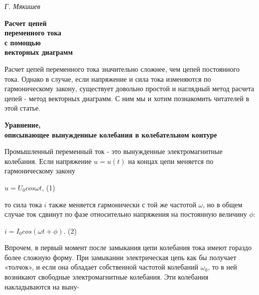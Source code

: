 



\newpage

\renewcommand{\headrulewidth}{0.6pt}
\setcounter{page}{51}
\fancyhf{}
\fancyfoot[R]{\bfseries\thepage}

\begin{multicols}{2}
\begin{flushleft}
    \textit{Г. Мякишев}
\end{flushleft}

\begin{flushleft}
    \Large \textbf{Расчет цепей \\ переменного тока \\ с помощью \\ векторных диаграмм}
\end{flushleft}

\begin{flushleft}
    Расчет цепей переменного тока значительно сложнее, чем цепей постоянного тока. Однако в случае, если напряжение и сила тока изменяются по гармоническому закону, существует довольно простой и наглядный метод расчета цепей - метод векторных диаграмм. С ним мы и хотим познакомить читателей в этой статье.
\end{flushleft}

\begin{flushleft}
    \textbf{Уравнение, \\ описывающее вынужденные колебания в колебательном контуре}
\end{flushleft}
Промышленный переменный ток - это вынужденные электромагнитные колебания. Если напряжение $u = u(t)$ на концах цепи меняется по гармоническому закону
\begin{center} $u = U_0cos\omega t$, (1) \end{center}

\noindent то сила тока $i$ также меняется гармонически с той же частотой $\omega$, но в общем случае ток сдвинут по фазе относительно напряжения на постоянную величину $\phi$:
\begin{center}
    $i=I_0cos(\omega t + \phi)$. (2)
\end{center}

\indent Впрочем, в первый момент после замыкания цепи колебания тока имеют гораздо более сложную форму. При замыкании электрическая цепь как бы получает «толчок», и если она обладает собственной частотой колебаний $\omega_0$, то в ней возникают свободные электромагнитные колебания. Эти колебания накладываются на выну-


\end{multicols}
